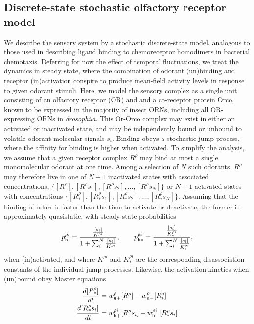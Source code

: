 

\subsection*{Discrete-state stochastic olfactory receptor model}

We describe the sensory system by a stochastic discrete-state model, analogous to those used in describing ligand binding to chemoreceptor homodimers in bacterial chemotaxis. Deferring for now the effect of temporal fluctuations, we treat the dynamics in steady state, where the combination of odorant (un)binding and receptor (in)activation conspire to produce mean-field activity levels in response to given odorant stimuli. Here, we model the sensory complex as a single unit consisting of an olfactory receptor (OR) and and a co-receptor protein Orco, known to be expressed in the majority of insect ORNs, including all OR-expressing ORNs in \textit{drosophila}. This Or-Orco complex may exist in either an activated or inactivated state, and may be independently bound or unbound to volatile odorant molecular signals $s_i$. Binding obeys a stochastic jump process, where the affinity for binding is higher when activated. To simplify the analysis, we assume that a given receptor complex $R^\rho$ may bind at most a single monomolecular odorant at one time. Among a selection of $N$ such odorants, $R^{\rho}$ may therefore live in one of $N+1$ inactivated states with associated concentrations, $\{[R^\rho], [R^\rho s_1], [R^\rho s_2],...,[R^\rho  s_N]\}$ or $N+1$ activated states with concentrations $\{[R^\rho _*], [R^\rho _*s_1], [R^\rho _*s_2],...,[R^\rho _*s_N]\}$. 
Assuming that the binding of odors is faster than the time to activate or deactivate, the former is approximately quasistatic, with steady state probabilities
\begin{align}
p_{\text b}^{\rho i} = \frac{\frac{[s_i]}{K^{\rho i}}}{1 + \sum_i^N \frac{[s_i]}{K^{\rho i}}}, \qquad  
p_{\text b*}^{\rho i} = \frac{\frac{[s_i]}{K_*^{\rho i}}}{1 + \sum_i^N \frac{[s_i]}{K_*^{\rho i}}},
\label{eq:steady_state_binding_probabilities}
\end{align}
when (in)activated, and where $K^{\rho i}$ and $K^{\rho i}_*$ are the corresponding disassociation constants of the individual jump processes. Likewise, the activation kinetics when (un)bound obey Master equations
\begin{align}
\frac{d[R_*^\rho]}{dt} &= w_{\text u +}^\rho [R^\rho] - w_{\text u -}^\rho [R_*^\rho] \\
\frac{d[R_*^\rho s_i]}{dt} &= w_{\text b +}^{\rho i} [R^\rho s_i] - w_{\text b -}^{\rho i} [R_*^\rho s_i]
\label{eq:activation_master_equations}
\end{align}

